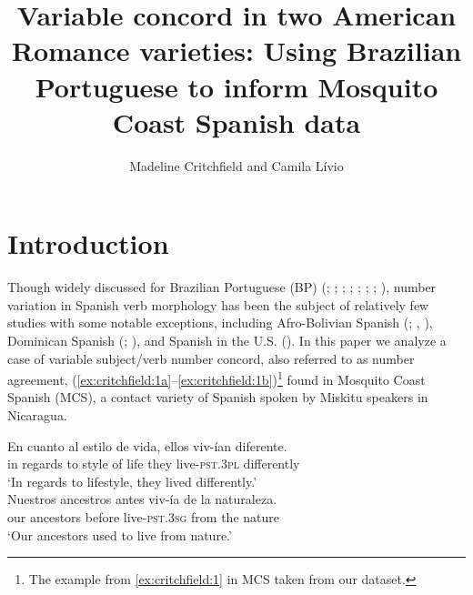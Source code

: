 \documentclass[output=paper,colorlinks,citecolor=brown,
]{langscibook}
\author{Madeline Critchfield\affiliation{University of Georgia} and Camila Lívio\affiliation{University of Georgia}}
\title{Variable concord in two American Romance varieties: Using Brazilian Portuguese to inform Mosquito Coast Spanish data}
\begin{document}
\maketitle

\section{Introduction}

Though widely discussed for Brazilian Portuguese (BP) (\citealt{scherre1998variaccao}; \citealt{naro2000variable}; \citealt{scherre2001origens}; \citealt{guy2005questao}; \citealt{lucchesi2009portugues}; \citealt{brandao2012concordancia}; \citealt{scherre2014sociolinguistic}; \citealt{mendes2015variable}), number variation in Spanish verb morphology has been the subject of relatively few studies with some notable exceptions, including Afro-Bolivian Spanish (\citealt{lipski2008a}; \citealt{sessarego2011status}, \citeyear{sessarego2012non}), Dominican Spanish (\citealt{foote2012role}; \citealt{guy2017african}), and Spanish in the U.S. (\citealt{lipski2008c}). In this paper we analyze a case of variable subject/verb number concord, also referred to as number agreement, (\ref{ex:critchfield:1a}--\ref{ex:critchfield:1b})\footnote{The example from \ref{ex:critchfield:1} in MCS taken from our dataset.} found in Mosquito Coast Spanish (MCS), a contact variety of Spanish spoken by Miskitu speakers in Nicaragua.  


\begin{exe} %
    \ex\label{ex:critchfield:1} 
    \begin{xlist} %
        \ex\label{ex:critchfield:1a}
        \gll    En    cuanto    al    estilo    de    vida,    ellos    viv-ían diferente.\\  
   in    regards    to    style     of     life      they     live-\textsc{pst}.\textsc{3pl}      differently\\
    \glt    `In regards to lifestyle, they lived differently.'\\
        \ex\label{ex:critchfield:1b}
    \gll   Nuestros    ancestros    antes    viv-ía   de la naturaleza.\\
      our ancestors    before   live-\textsc{pst}.\textsc{3sg}      from    the     nature\\
    \glt    `Our ancestors used to live from nature.'
\end{xlist}
\end{exe}
\end{document}
